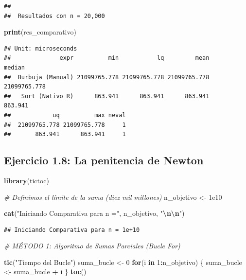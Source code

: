 \documentclass[]{llncs}
\newenvironment{Shaded}{\begin{snugshade}}{\end{snugshade}}
\newcommand{\CommentTok}[1]{\textcolor[rgb]{0.56,0.35,0.01}{\textit{#1}}}
\newcommand{\ControlFlowTok}[1]{\textcolor[rgb]{0.13,0.29,0.53}{\textbf{#1}}}
\newcommand{\DecValTok}[1]{\textcolor[rgb]{0.00,0.00,0.81}{#1}}
\newcommand{\FloatTok}[1]{\textcolor[rgb]{0.00,0.00,0.81}{#1}}
\newcommand{\FunctionTok}[1]{\textcolor[rgb]{0.13,0.29,0.53}{\textbf{#1}}}
\newcommand{\NormalTok}[1]{#1}
\newcommand{\OtherTok}[1]{\textcolor[rgb]{0.56,0.35,0.01}{#1}}
\newcommand{\SpecialCharTok}[1]{\textcolor[rgb]{0.81,0.36,0.00}{\textbf{#1}}}
\newcommand{\StringTok}[1]{\textcolor[rgb]{0.31,0.60,0.02}{#1}}
\begin{document}
\begin{verbatim}
## 
##  Resultados con n = 20,000
\end{verbatim}

\begin{Shaded}
\begin{Highlighting}[]
\FunctionTok{print}\NormalTok{(res\_comparativo)}
\end{Highlighting}
\end{Shaded}

\begin{verbatim}
## Unit: microseconds
##              expr          min           lq         mean       median
##  Burbuja (Manual) 21099765.778 21099765.778 21099765.778 21099765.778
##   Sort (Nativo R)      863.941      863.941      863.941      863.941
##            uq          max neval
##  21099765.778 21099765.778     1
##       863.941      863.941     1
\end{verbatim}

\subsection{Ejercicio 1.8: La penitencia de
Newton}\label{ejercicio-1.8-la-penitencia-de-newton}

\begin{Shaded}
\begin{Highlighting}[]
\FunctionTok{library}\NormalTok{(tictoc)}

\CommentTok{\# Definimos el límite de la suma (diez mil millones)}
\NormalTok{n\_objetivo }\OtherTok{\textless{}{-}} \FloatTok{1e10} 

\FunctionTok{cat}\NormalTok{(}\StringTok{"Iniciando Comparativa para n ="}\NormalTok{, n\_objetivo, }\StringTok{"}\SpecialCharTok{\textbackslash{}n\textbackslash{}n}\StringTok{"}\NormalTok{)}
\end{Highlighting}
\end{Shaded}

\begin{verbatim}
## Iniciando Comparativa para n = 1e+10
\end{verbatim}

\begin{Shaded}
\begin{Highlighting}[]
\CommentTok{\# MÉTODO 1: Algoritmo de Sumas Parciales (Bucle For)}


\FunctionTok{tic}\NormalTok{(}\StringTok{"Tiempo del Bucle"}\NormalTok{)}
\NormalTok{suma\_bucle }\OtherTok{\textless{}{-}} \DecValTok{0}
\ControlFlowTok{for}\NormalTok{(i }\ControlFlowTok{in} \DecValTok{1}\SpecialCharTok{:}\NormalTok{n\_objetivo) \{}
\NormalTok{  suma\_bucle }\OtherTok{\textless{}{-}}\NormalTok{ suma\_bucle }\SpecialCharTok{+}\NormalTok{ i}
\NormalTok{\}}
\FunctionTok{toc}\NormalTok{()}
\end{Highlighting}
\end{Shaded}
\end{document}
